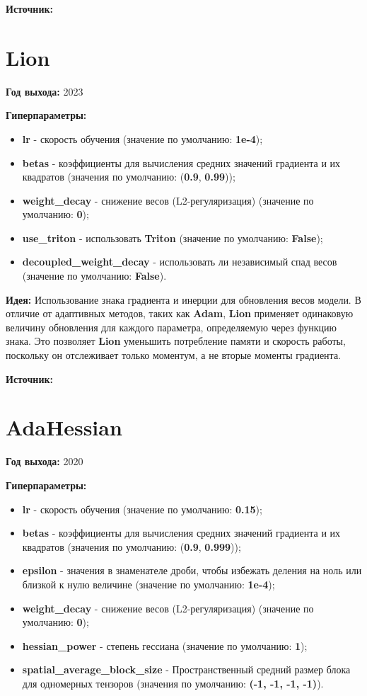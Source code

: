 \documentclass{article}
\begin{document}
\textbf{Источник:} \cite{adabelief}

\section{\textbf{Lion}}

\textbf{Год выхода:} 2023

\textbf{Гиперпараметры:}

\begin{itemize}
    \item \textbf{lr} - скорость обучения (значение по умолчанию: \textbf{1e-4});
    \item \textbf{betas} - коэффициенты для вычисления средних значений градиента и их квадратов (значения по умолчанию: (\textbf{0.9}, \textbf{0.99}));
    \item \textbf{weight\_decay} - снижение весов (L2-регуляризация) (значение по умолчанию: \textbf{0});
    \item \textbf{use\_triton} - использовать \textbf{Triton} (значение по умолчанию: \textbf{False});
    \item \textbf{decoupled\_weight\_decay} - использовать ли независимый спад весов (значение по умолчанию: \textbf{False}).
\end{itemize}

\textbf{Идея:} Использование знака градиента и инерции для обновления весов модели. В отличие от адаптивных методов, таких как \textbf{Adam}, \textbf{Lion} применяет одинаковую величину обновления для каждого параметра, определяемую через функцию знака. Это позволяет \textbf{Lion} уменьшить потребление памяти и скорость работы, поскольку он отслеживает только моментум, а не вторые моменты градиента.

\textbf{Источник:} \cite{lion}

\section{\textbf{AdaHessian}}

\textbf{Год выхода:} 2020

\textbf{Гиперпараметры:}

\begin{itemize}
    \item \textbf{lr} - скорость обучения (значение по умолчанию: \textbf{0.15});
    \item \textbf{betas} - коэффициенты для вычисления средних значений градиента и их квадратов (значения по умолчанию: (\textbf{0.9}, \textbf{0.999}));
    \item \textbf{epsilon} - значения в знаменателе дроби, чтобы избежать деления на ноль или близкой к нулю величине (значение по умолчанию: \textbf{1e-4});
    \item \textbf{weight\_decay} - снижение весов (L2-регуляризация) (значение по умолчанию: \textbf{0});
    \item \textbf{hessian\_power} - степень гессиана (значение по умолчанию: \textbf{1});
    \item \textbf{spatial\_average\_block\_size} - Пространственный средний размер блока для одномерных тензоров (значения по умолчанию: \textbf{(-1, -1, -1, -1)}).
\end{itemize}
\end{document}
